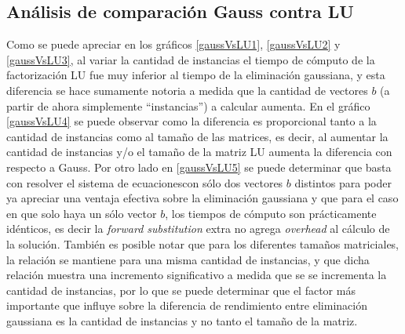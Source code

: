 \subsection{Análisis de comparación Gauss contra LU}
Como se puede apreciar en los gráficos \ref{gaussVsLU1}, \ref{gaussVsLU2} y \ref{gaussVsLU3}, al
variar la cantidad de instancias el tiempo de cómputo de la factorización LU fue muy inferior al
tiempo de la eliminación gaussiana, y esta diferencia se hace sumamente notoria a medida que la
cantidad de vectores $b$ (a partir de ahora simplemente ``instancias'') a calcular aumenta. En el gráfico 
\ref{gaussVsLU4} se puede observar como la diferencia es proporcional tanto a la cantidad de instancias como al 
tamaño de las matrices, es decir, al aumentar la cantidad de instancias y/o el tamaño de la matriz LU aumenta 
la diferencia con respecto a Gauss. Por otro lado en \ref{gaussVsLU5} se puede determinar que basta con resolver el 
sistema de ecuacionescon sólo dos vectores $b$ distintos para poder ya apreciar una ventaja efectiva sobre la eliminación gaussiana 
y que para el caso en que solo haya un sólo vector $b$, los tiempos de cómputo son prácticamente idénticos, es decir la 
\emph{forward substitution} extra no agrega \emph{overhead} al cálculo de la solución. También es posible notar que para 
los diferentes tamaños matriciales, la relación se mantiene para una misma cantidad de instancias, y que dicha relación 
muestra una incremento significativo a medida que se se incrementa la cantidad de instancias, por lo que se puede determinar 
que el factor más importante que influye sobre la diferencia de rendimiento entre eliminación gaussiana es la cantidad de 
instancias y no tanto el tamaño de la matriz.
